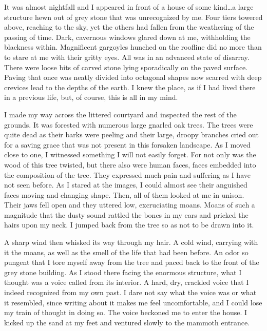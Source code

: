 \documentclass[
]{article}
\begin{document}
It was almost nightfall and I appeared in front of a house of some
kind\ldots a large structure hewn out of grey stone that was
unrecognized by me. Four tiers towered above, reaching to the sky, yet
the others had fallen from the weathering of the passing of time. Dark,
cavernous windows glared down at me, withholding the blackness within.
Magnificent gargoyles hunched on the roofline did no more than to stare
at me with their gritty eyes. All was in an advanced state of disarray.
There were loose bits of carved stone lying sporadically on the paved
surface. Paving that once was neatly divided into octagonal shapes now
scarred with deep crevices lead to the depths of the earth. I knew the
place, as if I had lived there in a previous life, but, of course, this
is all in my mind.

I made my way across the littered courtyard and inspected the rest of
the grounds. It was forested with numerous large gnarled oak trees. The
trees were quite dead as their barks were peeling and their large,
droopy branches cried out for a saving grace that was not present in
this forsaken landscape. As I moved close to one, I witnessed something
I will not easily forget. For not only was the wood of this tree
twisted, but there also were human faces, faces embedded into the
composition of the tree. They expressed much pain and suffering as I
have not seen before. As I stared at the images, I could almost see
their anguished faces moving and changing shape. Then, all of them
looked at me in unison. Their jaws fell open and they uttered low,
excruciating moans. Moans of such a magnitude that the dusty sound
rattled the bones in my ears and pricked the hairs upon my neck. I
jumped back from the tree so as not to be drawn into it.

A sharp wind then whisked its way through my hair. A cold wind, carrying
with it the moans, as well as the smell of the life that had been
before. An odor so pungent that I tore myself away from the tree and
paced back to the front of the grey stone building. As I stood there
facing the enormous structure, what I thought was a voice called from
its interior. A hard, dry, crackled voice that I indeed recognized from
my own past. I dare not say what the voice was or what it resembled,
since writing about it makes me feel uncomfortable, and I could lose my
train of thought in doing so. The voice beckoned me to enter the house.
I kicked up the sand at my feet and ventured slowly to the mammoth
entrance.
\end{document}
